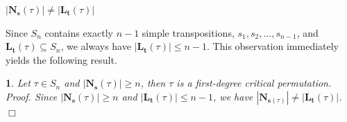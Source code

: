 \documentclass[a4 paper,12pt]{article}
\newtheorem{numeris}{}[section]
\begin{document}
\begin{center}
$\left|\textbf{N}_{\textbf{s}}(\tau)\right| \neq \left|\textbf{L}_{\textbf{t}}(\tau) \right| $
\end{center}
Since $S_n$ contains exactly $n-1$ simple transpositions, $s_1, s_2, \ldots, s_{n-1}$, and $\textbf{L}_{\textbf{t}}(\tau) \subseteq S_n$, we always have $\left|\textbf{L}_{\textbf{t}}(\tau) \right| \leq n-1$.
This observation immediately yields the following result.







\begin{numeris} \textit{Let $\tau\in S_n$ and $\left|\textbf{N}_{\textbf{s}}(\tau)\right|\geq n$, then $\tau$ is a first-degree critical permutation.} \\  


\textit{Proof.}  Since $\left|\textbf{N}_{\textbf{s}}(\tau)\right|\geq n$ and  $\left|\textbf{L}_{\textbf{t}}(\tau) \right|\leq n-1$, we have $\left|\textbf{N}_{\textbf{s}(\tau)}\right|\neq \left|\textbf{L}_{\textbf{t}}(\tau) \right| $. \hfill $\Box$ 
\label{firs_degree_for_sure}
\end{numeris}

 
\end{document}
